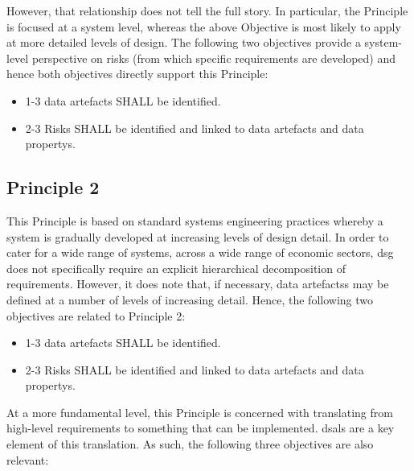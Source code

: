However, that relationship does not tell the full story. In particular, the Principle is focused at a system level, whereas the above Objective is most likely to apply at more detailed levels of design. The following two objectives provide a system-level perspective on risks (from which specific requirements are developed) and hence both objectives directly support this Principle:

\begin{itemize}
	\item \textcolor{dsiwgAccentColour}{1-3} \Glspl{data artefact} SHALL be identified.
	\item \textcolor{dsiwgAccentColour}{2-3} Risks SHALL be identified and linked to \glspl{data artefact} and \glspl{data property}.
\end{itemize}


\subsection{Principle 2}

This Principle is based on standard systems engineering practices whereby a system is gradually developed at increasing levels of design detail. In order to cater for a wide range of systems, across a wide range of economic sectors, \gls{dsg} does not specifically require an explicit hierarchical decomposition of requirements. However, it does note that, if necessary, \glspl{data artefact}s may be defined at a number of levels of increasing detail. Hence, the following two objectives are related to Principle 2:

\begin{itemize}
	\item \textcolor{dsiwgAccentColour}{1-3} \Glspl{data artefact} SHALL be identified.
	\item \textcolor{dsiwgAccentColour}{2-3} Risks SHALL be identified and linked to \glspl{data artefact} and \glspl{data property}.
\end{itemize}

At a more fundamental level, this Principle is concerned with translating from high-level requirements to something that can be implemented. \Glspl{dsal} are a key element of this translation. As such, the following three objectives are also relevant:


